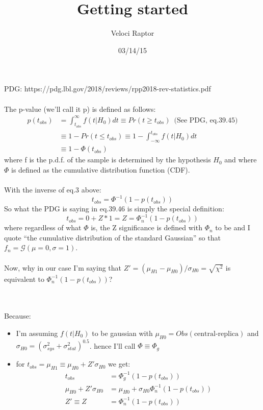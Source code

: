 \documentclass[12pt]{article}
\title{Getting started}
\author{Veloci Raptor}
\date{03/14/15}
\begin{document}
PDG: https://pdg.lbl.gov/2018/reviews/rpp2018-rev-statistics.pdf
\\\\
The p-value (we'll call it p) is defined as follows:
\begin{align}
p(t_{obs}) & = \int_{t_{obs}}^{\infty}f(t|H_0)dt \equiv Pr(t \geq t_{obs}) \,\,\, \text{(See PDG, eq.39.45)} \\
& \equiv 1 - Pr(t \leq t_{obs}) \equiv 1 - \int_{-\infty}^{t_{obs}}f(t|H_0)dt \\
& \equiv 1 - \Phi(t_{obs})
\end{align}
where f is the p.d.f. of the sample is determined by the hypothesis $H_0$ and where $\Phi$ is defined as the cumulative distribution function (CDF).
\\\\
With the inverse of eq.3 above:
\begin{equation}
t_{obs} = \Phi^{-1}(1-p(t_{obs}))
\end{equation}
So what the PDG is saying in eq.39.46 is simply the special definition:
\begin{equation}
t_{obs} = 0 + Z*1 = Z = \Phi_n^{-1}(1-p(t_{obs}))
\end{equation}
where regardless of what $\Phi$ is, the Z significance is defined with $\Phi_n$ to be and I quote ``the cumulative distribution of the standard Gaussian'' so that $f_n=\mathcal{G}(\mu=0,\sigma=1)$.
\\\\
Now, why in our case I'm saying that $Z'=(\mu_{H1} -  \mu_{H0})/\sigma_{H0} = \sqrt{\chi^2}$ is equivalent to $\Phi_n^{-1}(1-p(t_{obs})) $? 

\\\\
Because:
\begin{itemize}
\item I'm assuming $f(t|H_0)$ to be gaussian with $\mu_{H0} = Obs(\text{central-replica})$ and $\sigma_{H0} = (\sigma^2_{sys}+\sigma^2_{stat})^{0.5}$. hence I'll call $\Phi \equiv \Phi_g$
\item for $t_{obs} = \mu_{H1} \equiv \mu_{H0} + Z'\sigma_{H0}$ we get:
\begin{align}
t_{obs} &= \Phi_g^{-1}(1-p(t_{obs}))\\
\mu_{H0} + Z'\sigma_{H0} & = \mu_{H0} + \sigma_{H0}\Phi_n^{-1}(1-p(t_{obs}))\\
 Z' \equiv Z &= \Phi_n^{-1}(1-p(t_{obs}))
\end{align}
\end{itemize}
\end{document}
